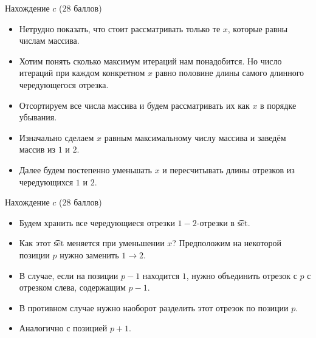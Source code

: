
\begin{frame}{Нахождение $c$ ($28$ баллов)}
  \begin{itemize}
  \item Нетрудно показать, что стоит рассматривать только те $x$, которые равны числам массива.
  \item Хотим понять сколько максимум итераций нам понадобится. Но число итераций при каждом конкретном $x$ равно половине длины
    самого длинного чередующегося отрезка.
    \medskip
  \item Отсортируем все числа массива и будем рассматривать их как $x$ в порядке убывания.
  \item Изначально сделаем $x$ равным максимальному числу массива и заведём массив из $1$ и $2$.
  \item Далее будем постепенно уменьшать $x$ и пересчитывать длины отрезков из чередующихся $1$ и $2$.
  \end{itemize}
\end{frame}

\begin{frame}{Нахождение $c$ ($28$ баллов)}
  \begin{itemize}
  \item Будем хранить все чередующиеся отрезки $1-2$-отрезки в \t{set}.
  \item Как этот \t{set} меняется при уменьшении $x$? Предположим на некоторой позиции $p$ нужно заменить $1 \to 2$.
  \item В случае, если на позиции $p - 1$ находится $1$, нужно объединить отрезок с $p$ с отрезком слева, содержащим $p - 1$.
  \item В противном случае нужно наоборот разделить этот отрезок по позиции $p$.
  \item Аналогично с позицией $p + 1$.
  \end{itemize}
\end{frame}

